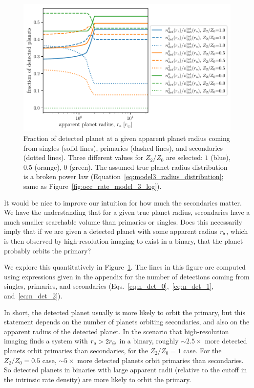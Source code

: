 \documentclass[12pt,modern]{aastex61}
\renewcommand{\a}{_{\rm a}}
\begin{document}
\begin{figure}[!t]
    \centering
    \includegraphics[width=\textwidth]{figures/ndet_vs_radius_logx_model_3_fraclines_rpu_22.5_manyZs.pdf}
    \caption{
        Fraction of detected planet at a given apparent planet radius coming 
        from singles (solid lines), primaries (dashed lines), and secondaries 
        (dotted lines).
        Three different values for $Z_2/Z_0$ are selected: $1$ (blue), $0.5$ 
        (orange), $0$ (green).
        The assumed true planet radius distribution is a broken power law
        (Equation~\ref{eq:model3_radius_distribution}; same as 
        Figure~\ref{fig:occ_rate_model_3_log}).
    }
    \label{fig:frac_model_3}
\end{figure}

It would be nice to improve our intuition for how much the secondaries matter.
We have the understanding that for a given true planet radius, secondaries 
have a much smaller searchable volume than primaries or singles.
Does this necessarily imply that if we are given a detected planet with some 
apparent radius $r\a$, which is then observed by high-resolution imaging to 
exist in a binary, that the planet probably orbits the primary?

We explore this quantitatively in Figure~\ref{fig:frac_model_3}.
The lines in this figure are computed using expressions given in the 
appendix for the number of detections coming from singles, primaries, and 
secondaries (Eqs.~\ref{eq:n_det_0},~\ref{eq:n_det_1}, and~\ref{eq:n_det_2}).

In short, the detected planet usually is more likely to orbit the primary, but 
this statement depends on the number of planets orbiting secondaries, and also 
on the apparent radius of the detected planet.
In the scenario that high-resolution imaging finds a system with $r\a > 
2r_\oplus$ in a binary, roughly $\sim\! 2.5\times$ more detected planets orbit 
primaries than secondaries, for the $Z_2/Z_0=1$ case.
For the $Z_2/Z_0=0.5$ case, $\sim\! 5\times$ more detected 
planets orbit primaries than secondaries.
So detected planets in binaries with large apparent radii (relative to the 
cutoff in the intrinsic rate density) are more likely to orbit the primary.
\end{document}
